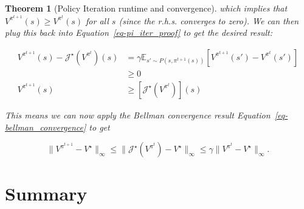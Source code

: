 \documentclass[
  letterpaper,
  DIV=11,
  numbers=noendperiod]{scrreprt}
\theoremstyle{plain}
\theoremstyle{plain}
\newtheorem{theorem}{Theorem}[chapter]
\theoremstyle{definition}
\theoremstyle{definition}
\theoremstyle{remark}
\begin{document}
\begin{theorem}[Policy Iteration runtime and
convergence]
which implies that \(V^{\pi^{t+1}}(s) \ge V^{\pi^{t}}(s)\) for all \(s\)
(since the r.h.s. converges to zero). We can then plug this back into
Equation~\ref{eq-pi_iter_proof} to get the desired result:

\[
\begin{aligned}
    V^{\pi^{t+1}}(s) - \mathcal{J}^{\star} (V^{\pi^{t}})(s) &= \gamma \mathbb{E}_{s' \sim P(s, \pi^{t+1}(s))} \left[V^{\pi^{t+1}}(s') -  V^{\pi^{t}}(s') \right] \\
    &\ge 0 \\
    V^{\pi^{t+1}}(s) &\ge [\mathcal{J}^{\star}(V^{\pi^{t}})](s)
\end{aligned}
\]

This means we can now apply the Bellman convergence result
Equation~\ref{eq-bellman_convergence} to get

\[\|V^{\pi^{t+1}} - V^\star \|_{\infty} \le \|\mathcal{J}^{\star} (V^{\pi^{t}}) - V^{\star}\|_{\infty} \le \gamma \|V^{\pi^{t}} - V^\star \|_{\infty}.\]

\end{theorem}

\section{Summary}\label{summary}
\end{document}
